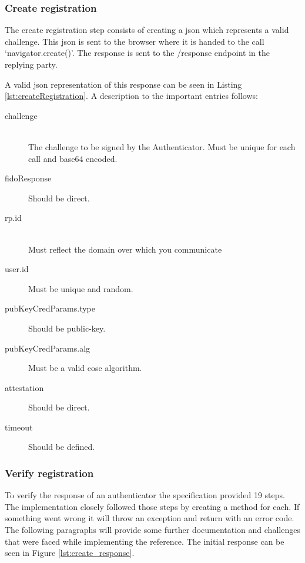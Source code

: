 \documentclass[a4paper, 11pt]{scrartcl}
\begin{document}
\subsubsection{Create registration}

The create registration step consists of creating a \gls{json} which represents a valid challenge. This \gls{json} is sent to the browser where it is handed to the call `navigator.create()'. The response is sent to the /response endpoint in the replying party.

A valid \gls{json} representation of this response can be seen in Listing \ref{lst:createRegistration}. A description to the important entries follows:



\begin{description}
  \item[challenge] \hfill \\ The challenge to be signed by the Authenticator. Must be unique for each call and \gls{base64} encoded.
  \item[fidoResponse] Should be direct. 
  \item[rp.id] \hfill \\ Must reflect the domain over which you communicate
  \item[user.id] Must be unique and random. 
  \item[pubKeyCredParams.type] Should be public-key. 
  \item[pubKeyCredParams.alg] Must be a valid \gls{cose} algorithm. \cite{cose}
  \item[attestation] Should be direct.
  \item[timeout] Should be defined.   
\end{description}


\subsubsection{Verify registration}

To verify the response of an authenticator the specification provided 19 steps. The implementation closely followed those steps by creating a method for each. If something went wrong it will throw an exception and return with an error code. The following paragraphs will provide some further documentation and challenges that were faced while implementing the reference. The initial response can be seen in Figure \ref{lst:create_response}.
\end{document}
